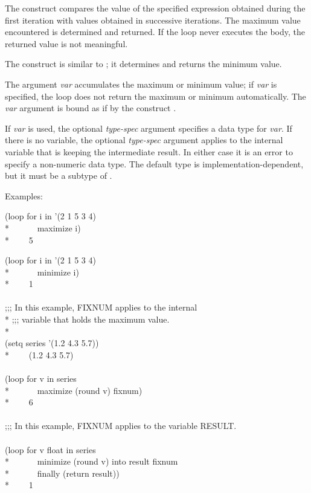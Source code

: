 \begin{new}
\begin{defloop}
The  construct compares the value of the specified expression
obtained during the first iteration with values obtained in successive
iterations. The maximum value encountered is determined and returned.  If the
loop never executes the body, the returned value is not meaningful.

The  construct is similar to ; it
determines and returns the minimum value.

The argument {\it var\/} accumulates the maximum or
minimum value; if {\it var} is specified, the loop
does not return the maximum or minimum automatically.  The {\it var\/} argument
is bound as if by the construct .

If  {\it var\/} is used, the optional
{\it type-spec\/} argument specifies a data type for {\it var\/}.
If there is no  variable, the optional {\it type-spec\/}
argument applies to the internal variable that is keeping the intermediate result.
In either case it is an error to specify a non-numeric 
data type.
The default type is implementation-dependent, but it must be a subtype
of .

Examples:
\begin{lisp}
(loop for i in '(2 1 5 3 4) \\*
~~~~~~maximize i) \\*
~~~\EV~5
\end{lisp}
\begin{lisp}
(loop for i in '(2 1 5 3 4) \\*
~~~~~~minimize i) \\*
~~~\EV~1 \\
 \\
;;; In this example, FIXNUM applies to the internal \\*
;;; variable that holds the maximum value. \\*
\\
(setq series '(1.2 4.3 5.7)) \\*
~~~\EV~(1.2 4.3 5.7) \\
\\
(loop for v in series  \\*
~~~~~~maximize (round v) fixnum) \\*
~~~\EV~6 \\
 \\
;;; In this example, FIXNUM applies to the variable RESULT. \\
\\
(loop for v float in series \\*
~~~~~~minimize (round v) into result fixnum \\*
~~~~~~finally (return result)) \\*
~~~\EV~1
\end{lisp}
\end{defloop}




\end{new}
